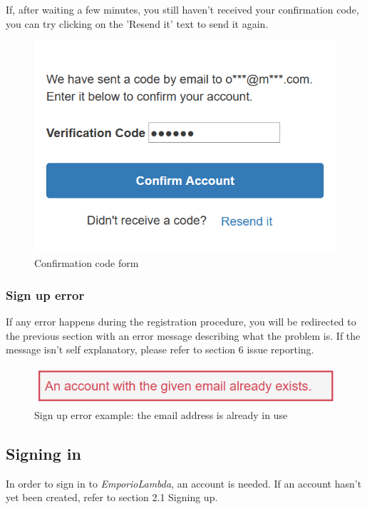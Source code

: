 If, after waiting a few minutes, you still haven't received your confirmation code, you can try clicking on the 'Resend it' text to send it again.

\begin{figure}[H]
\centering
\includegraphics[scale=0.6]{res/Immagini/RegisterCode}
\caption{Confirmation code form}
\end{figure}

\subsubsection{Sign up error}
If any error happens during the registration procedure, you will be redirected to the previous section with an error message describing what the problem is. If the message isn't self explanatory, please refer to section 6 issue reporting.

\begin{figure}[H]
\centering
\includegraphics[scale=0.6]{res/Immagini/RegisterError}
\caption{Sign up error example: the email address is already in use}
\end{figure}

\subsection{Signing in}
In order to sign in to \textit{EmporioLambda}, an account is needed. If an account hasn't yet been created, refer to section 2.1 Signing up.

